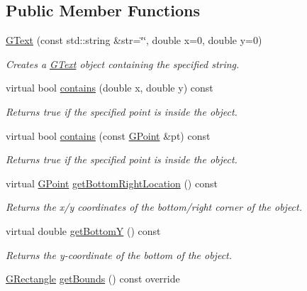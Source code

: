 \subsection*{Public Member Functions}
\begin{DoxyCompactItemize}
\item 
\mbox{\hyperlink{classsgl_1_1GText_ad86d52c255aab367ddc6c54baff70846}{G\+Text}} (const std\+::string \&str=\char`\"{}\char`\"{}, double x=0, double y=0)
\begin{DoxyCompactList}\small\item\em Creates a {\ttfamily \mbox{\hyperlink{classsgl_1_1GText}{G\+Text}}} object containing the specified string. \end{DoxyCompactList}\item 
virtual bool \mbox{\hyperlink{classsgl_1_1GObject_abb6a5d7c03e6eaaae97264c4799ce7c3}{contains}} (double x, double y) const
\begin{DoxyCompactList}\small\item\em Returns {\ttfamily true} if the specified point is inside the object. \end{DoxyCompactList}\item 
virtual bool \mbox{\hyperlink{classsgl_1_1GObject_a1dbc9dafaae51958112dbe1267a1f547}{contains}} (const \mbox{\hyperlink{structsgl_1_1GPoint}{G\+Point}} \&pt) const
\begin{DoxyCompactList}\small\item\em Returns {\ttfamily true} if the specified point is inside the object. \end{DoxyCompactList}\item 
virtual \mbox{\hyperlink{structsgl_1_1GPoint}{G\+Point}} \mbox{\hyperlink{classsgl_1_1GObject_a0d41183bf6b08de66fe3907551aab0d7}{get\+Bottom\+Right\+Location}} () const
\begin{DoxyCompactList}\small\item\em Returns the x/y coordinates of the bottom/right corner of the object. \end{DoxyCompactList}\item 
virtual double \mbox{\hyperlink{classsgl_1_1GObject_a4316a2406c18e1c6d061fe51fd355490}{get\+BottomY}} () const
\begin{DoxyCompactList}\small\item\em Returns the {\itshape y}-\/coordinate of the bottom of the object. \end{DoxyCompactList}\item 
\mbox{\hyperlink{structsgl_1_1GRectangle}{G\+Rectangle}} \mbox{\hyperlink{classsgl_1_1GText_a89040ce9277825772d359fccd33bca86}{get\+Bounds}} () const override

\end{DoxyCompactItemize}
